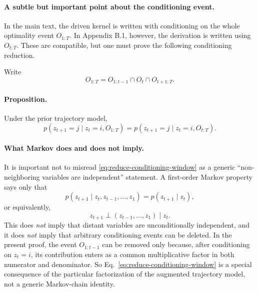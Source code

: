 \documentclass[11pt]{article}
\begin{document}
\paragraph{A subtle but important point about the conditioning event.}
In the main text, the driven kernel is written with conditioning on the whole optimality
event \(O_{1:T}\). In Appendix B.1, however, the derivation is written using \(O_{t:T}\).
These are compatible, but one must prove the following conditioning reduction.

Write
\begin{equation}
    O_{1:T} = O_{1:t-1}\cap O_t \cap O_{t+1:T}.
\end{equation}
\paragraph{Proposition.}
Under the prior trajectory model,
\begin{equation}
    p(z_{t+1}=j\mid z_t=i,O_{1:T})
    =
    p(z_{t+1}=j\mid z_t=i,O_{t:T}).
    \label{eq:reduce-conditioning-window}
\end{equation}

\paragraph{What Markov does and does not imply.}
It is important not to misread \eqref{eq:reduce-conditioning-window} as a generic
``non-neighboring variables are independent'' statement. A first-order Markov property says
only that
\begin{equation}
    p(z_{t+1}\mid z_t,z_{t-1},\dots,z_1)=p(z_{t+1}\mid z_t),
\end{equation}
or equivalently,
\begin{equation}
    z_{t+1}\perp (z_{t-1},\dots,z_1)\mid z_t.
\end{equation}
This does \emph{not} imply that distant variables are unconditionally independent, and it
does \emph{not} imply that arbitrary conditioning events can be deleted. In the present proof,
the event \(O_{1:t-1}\) can be removed only because, after conditioning on \(z_t=i\), its
contribution enters as a common multiplicative factor in both numerator and denominator.
So Eq.~\eqref{eq:reduce-conditioning-window} is a special consequence of the particular
factorization of the augmented trajectory model, not a generic Markov-chain identity.
\end{document}
